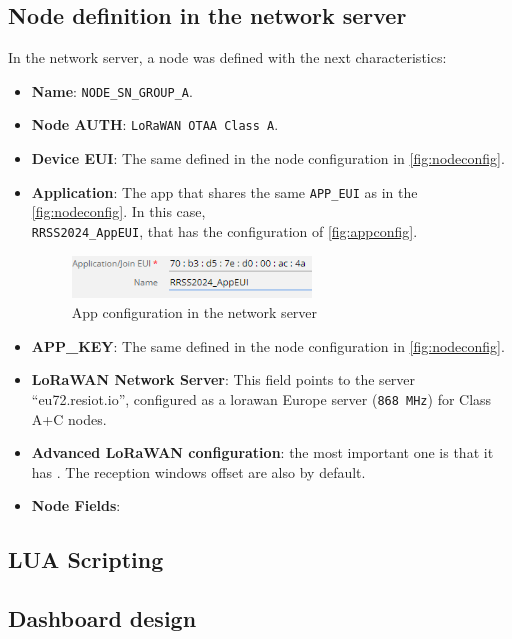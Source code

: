 \subsection{Node definition in the network server}

In the network server, a node was defined with the next characteristics:
\begin{itemize}
    \item \textbf{Name}: \texttt{NODE\_SN\_GROUP\_A}.
    \item \textbf{Node AUTH}: \texttt{LoRaWAN OTAA Class A}.
    \item \textbf{Device EUI}: The same defined in the node configuration in \autoref{fig:nodeconfig}.
    \item \textbf{Application}: The app that shares the same \texttt{APP\_EUI} as in the \autoref{fig:nodeconfig}. In this case, \\ \texttt{RRSS2024\_AppEUI}, that has the configuration of \autoref{fig:appconfig}.
    \begin{figure}[H]
        \centering
        \includegraphics[width=0.6\textwidth]{images/6/AppName.png}
        \caption{App configuration in the network server}
        \label{fig:appconfig}
    \end{figure}
    \item \textbf{APP\_KEY}: The same defined in the node configuration in \autoref{fig:nodeconfig}.
    \item \textbf{LoRaWAN Network Server}: This field points to the server ``eu72.resiot.io'', configured as a \acrshort{lorawan} Europe server (\texttt{868 MHz}) for Class A+C nodes.
    \item \textbf{Advanced LoRaWAN configuration}: the most important one is that it has . The reception windows offset are also by default.
    \item \textbf{Node Fields}:
\end{itemize}
\clearpage
\subsection{LUA Scripting}
\clearpage
\subsection{Dashboard design}
\clearpage